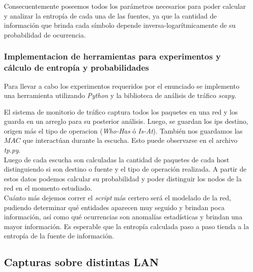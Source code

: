 Consecuentemente poseemos todos los parámetros necesarios para poder calcular y analizar la entropía de cada una de las fuentes,
ya que la cantidad de información que brinda cada símbolo depende inversa-logarítmicamente de su probabilidad de ocurrencia.\\

\subsubsection{Implementacion de herramientas para experimentos y cálculo de entropía y probabilidades}
Para llevar a cabo los experimentos requeridos por el enunciado se implemento una herramienta utilizando \emph{Python} y la biblioteca de 
análisis de tráfico \emph{scapy}.


El sistema de monitorio de tráfico captura todos los paquetes en una red y los guarda en un arreglo para su posterior análisis.
Luego, se guardan los ips destino, origen más el tipo de operacion (\emph{Who-Has} ó \emph{Is-At}). También nos guardamos las $MAC$ que interactúan
durante la escucha. Esto puede observarse en el archivo \emph{tp.py}.\\


Luego de cada escucha son calculadas la cantidad de paquetes de cada host distinguiendo si son destino o fuente y el tipo de operación realizada.
A partir de estos datos podemos calcular su probabilidad y poder distinguir los nodos de la red en el momento estudiado.\\

Cuánto más dejemos correr el \emph{script} más certero será el modelado de la red, pudiendo determinar qué entidades aparecen 
muy seguido y brindan poca información, así como qué ocurrencias son anomalías estadísticas y brindan una mayor información. 
Es esperable que la entropía calculada paso a paso tienda a la entropía de la fuente de información.

\subsection{Capturas sobre distintas LAN}




